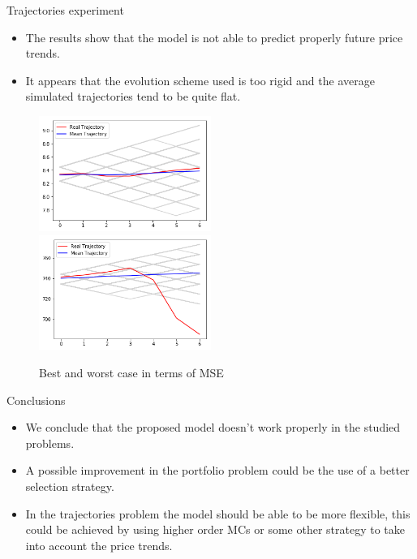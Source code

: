 \documentclass{beamer}
\begin{document}
	\begin{frame}{Trajectories experiment}
	\begin{itemize}
		\item The results show that the model is not able to predict properly future price trends.
		\item It appears that the evolution scheme used is too rigid and the average simulated trajectories tend to be quite flat.
	\end{itemize}
	\begin{figure}
	\includegraphics[width=0.5\textwidth]{../images/best_mse.png}%
	\includegraphics[width=0.5\textwidth]{../images/worst_mse.png}
	\caption{Best and worst case in terms of MSE}
	\end{figure}
	\end{frame}

	\begin{frame}{Conclusions}
	\begin{itemize}
		\item We conclude that the proposed model doesn't work properly in the studied problems.
		\item A possible improvement in the portfolio problem could be the use of a better selection strategy.
		\item In the trajectories problem the model should be able to be more flexible, this could be achieved by
			  using higher order MCs or some other strategy to take into account the price trends.
	\end{itemize}
	\end{frame}
\end{document}
